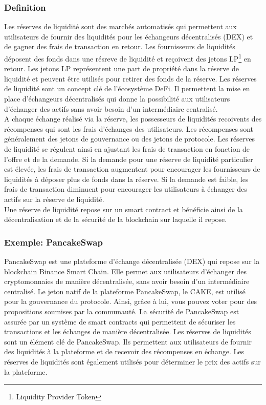 \subsubsection{Definition}
Les réserves de liquidité sont des marchés automatisés qui permettent aux utilisateurs de fournir des liquidités pour les échangeurs décentralisés (DEX) et de gagner des frais de transaction en retour. Les fournisseurs de liquidités déposent des fonds dans une résreve de liquidité et reçoivent des jetons LP\footnote{Liquidity Provider Token} en retour. Les jetons LP représentent une part de propriété dans la réserve de liquidité et peuvent être utilisés pour retirer des fonds de la réserve. Les réserves de liquidité sont un concept clé de l’écosystème DeFi. Il permettent la mise en place d'échangeurs décentralisés qui donne la possibilité aux utilisateurs d’échanger des actifs sans avoir besoin d’un intermédiaire centralisé. \\
A chaque échange réalisé via la réserve, les possesseurs de liquidités recoivents des récompenses qui sont les frais d'échanges des utilisateurs. Les récompenses sont généralement des jetons de gouvernance ou des jetons de protocole. Les réserves de liquidité se régulent ainsi en ajustant les frais de transaction en fonction de l’offre et de la demande. Si la demande pour une réserve de liquidité particulier est élevée, les frais de transaction augmentent pour encourager les fournisseurs de liquidités à déposer plus de fonds dans la réserve. Si la demande est faible, les frais de transaction diminuent pour encourager les utilisateurs à échanger des actifs sur la réserve de liquidité. \\
Une réserve de liquidité repose sur un smart contract et bénéficie ainsi de la décentralisation et de la sécurité de la blockchain sur laquelle il repose.

\subsubsection{Exemple: PancakeSwap}
PancakeSwap est une plateforme d’échange décentralisée (DEX) qui repose sur la blockchain Binance Smart Chain. Elle permet aux utilisateurs d’échanger des cryptomonnaies de manière décentralisée, sans avoir besoin d’un intermédiaire centralisé. Le jeton natif de la plateforme PancakeSwap, le CAKE, est utilisé pour la gouvernance du protocole. Ainsi, grâce à lui, vous pouvez voter pour des propositions soumises par la communauté. La sécurité de PancakeSwap est assurée par un système de smart contracts qui permettent de sécuriser les transactions et les échanges de manière décentralisée. Les réserves de liquidités sont un élément clé de PancakeSwap. Ils permettent aux utilisateurs de fournir des liquidités à la plateforme et de recevoir des récompenses en échange. Les réserves de liquidités sont également utilisés pour déterminer le prix des actifs sur la plateforme.

